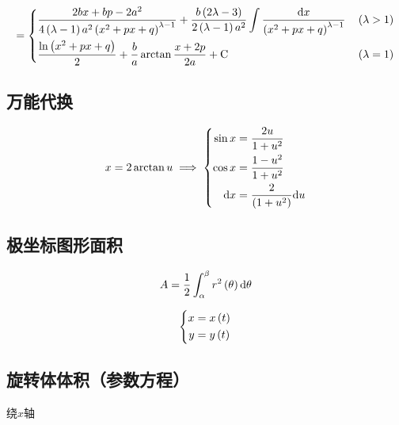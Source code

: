 \documentclass{article}
\begin{document}
\[=\left\{\begin{aligned}
         & \frac{2bx+bp-2a^2}{4\left(\lambda-1\right)a^2\left(x^2+px+q\right)^{\lambda-1}}+\frac{b\left(2\lambda-3\right)}{2\left(\lambda-1\right)a^2}\int\frac{\mathrm d x}{\left(x^2+px+q\right)^{\lambda-1}} &  &
        \left(\lambda>1\right)                                                                                                                                                        \\
         & \frac{\ln\left(x^2+px+q\right)}2+\frac ba\arctan{\frac{x+2p}{2a}}+\mathrm C                                                                                                  &  &
        \left(\lambda=1\right)                                                                                                                                                        \\
    \end{aligned}\right.\]

\subsection{万能代换}

\[x=2\arctan u\implies
    \left\{\begin{aligned}
        \sin x & =\frac{2u}{1+u^2}         \\
        \cos x & =\frac{1-u^2}{1+u^2}      \\
        \mathrm d x   & =\frac2{\left(1+u^2\right)}\mathrm d u
    \end{aligned}\right.\]

\subsection{极坐标图形面积}

\[A=\frac12\int_{\alpha}^{\beta}{r^2\left(\theta\right)\mathrm d\theta}\]

\begin{definition}[以下参数方程中都有]
    \[\left\{\begin{aligned}
            x & =x\left(t\right) \\
            y & =y\left(t\right)
        \end{aligned}\right.\]
\end{definition}

\subsection{旋转体体积（参数方程）}

绕$x$轴
\end{document}
